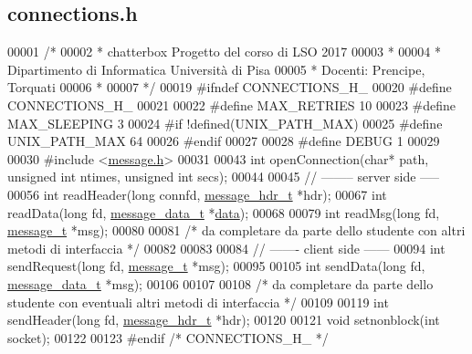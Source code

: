 \hypertarget{connections_8h_source}{}\subsection{connections.\+h}

\begin{DoxyCode}
00001 \textcolor{comment}{/*}
00002 \textcolor{comment}{ * chatterbox Progetto del corso di LSO 2017}
00003 \textcolor{comment}{ *}
00004 \textcolor{comment}{ * Dipartimento di Informatica Università di Pisa}
00005 \textcolor{comment}{ * Docenti: Prencipe, Torquati}
00006 \textcolor{comment}{ *}
00007 \textcolor{comment}{ */}
00019 \textcolor{preprocessor}{#ifndef CONNECTIONS\_H\_}
00020 \textcolor{preprocessor}{#define CONNECTIONS\_H\_}
00021 
00022 \textcolor{preprocessor}{#define MAX\_RETRIES     10}
00023 \textcolor{preprocessor}{#define MAX\_SLEEPING     3}
00024 \textcolor{preprocessor}{#if !defined(UNIX\_PATH\_MAX)}
00025 \textcolor{preprocessor}{#define UNIX\_PATH\_MAX  64}
00026 \textcolor{preprocessor}{#endif}
00027 
00028 \textcolor{preprocessor}{#define DEBUG 1}
00029 
00030 \textcolor{preprocessor}{#include <\mbox{\hyperlink{message_8h}{message.h}}>}
00031 
00043 \textcolor{keywordtype}{int} openConnection(\textcolor{keywordtype}{char}* path, \textcolor{keywordtype}{unsigned} \textcolor{keywordtype}{int} ntimes, \textcolor{keywordtype}{unsigned} \textcolor{keywordtype}{int} secs);
00044 
00045 \textcolor{comment}{// -------- server side -----}
00056 \textcolor{comment}{}\textcolor{keywordtype}{int} readHeader(\textcolor{keywordtype}{long} connfd, \mbox{\hyperlink{structmessage__hdr__t}{message\_hdr\_t}} *hdr);
00067 \textcolor{keywordtype}{int} readData(\textcolor{keywordtype}{long} fd, \mbox{\hyperlink{structmessage__data__t}{message\_data\_t}} *\mbox{\hyperlink{structdata}{data}});
00068 
00079 \textcolor{keywordtype}{int} readMsg(\textcolor{keywordtype}{long} fd, \mbox{\hyperlink{structmessage__t}{message\_t}} *msg);
00080 
00081 \textcolor{comment}{/* da completare da parte dello studente con altri metodi di interfaccia */}
00082 
00083 
00084 \textcolor{comment}{// ------- client side ------}
00094 \textcolor{comment}{}\textcolor{keywordtype}{int} sendRequest(\textcolor{keywordtype}{long} fd, \mbox{\hyperlink{structmessage__t}{message\_t}} *msg);
00095 
00105 \textcolor{keywordtype}{int} sendData(\textcolor{keywordtype}{long} fd, \mbox{\hyperlink{structmessage__data__t}{message\_data\_t}} *msg);
00106 
00107 
00108 \textcolor{comment}{/* da completare da parte dello studente con eventuali altri metodi di interfaccia */}
00109 
00119 \textcolor{keywordtype}{int} sendHeader(\textcolor{keywordtype}{long} fd, \mbox{\hyperlink{structmessage__hdr__t}{message\_hdr\_t}} *hdr);
00120 
00121 \textcolor{keywordtype}{void} setnonblock(\textcolor{keywordtype}{int} socket);
00122 
00123 \textcolor{preprocessor}{#endif }\textcolor{comment}{/* CONNECTIONS\_H\_ */}\textcolor{preprocessor}{}
\end{DoxyCode}
